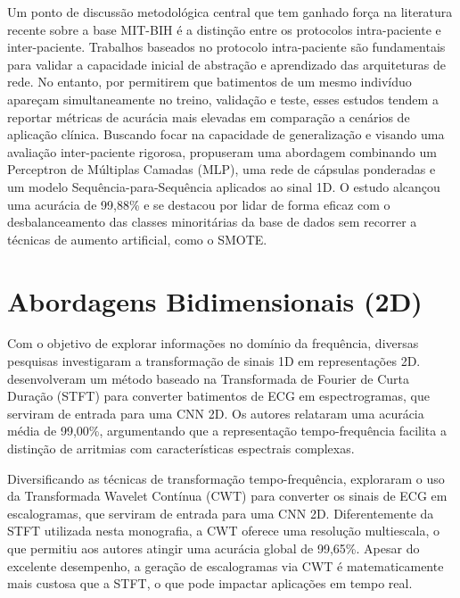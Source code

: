 Um ponto de discussão metodológica central que tem ganhado força na literatura recente sobre a base MIT-BIH é a distinção entre os protocolos 
intra-paciente e inter-paciente. Trabalhos baseados no protocolo intra-paciente são fundamentais para validar a capacidade inicial de abstração e 
aprendizado das arquiteturas de rede. No entanto, por permitirem que batimentos de um mesmo indivíduo apareçam simultaneamente no treino, validação e 
teste, esses estudos tendem a reportar métricas de acurácia mais elevadas em comparação a cenários de aplicação clínica. Buscando focar na capacidade 
de generalização e visando uma avaliação inter-paciente rigorosa,  propuseram uma abordagem combinando um Perceptron de 
Múltiplas Camadas (MLP), uma rede de cápsulas ponderadas e um modelo Sequência-para-Sequência aplicados ao sinal 1D. O estudo alcançou uma acurácia de 
99,88\% e se destacou por lidar de forma eficaz com o desbalanceamento das classes minoritárias da base de dados sem recorrer a técnicas de aumento 
artificial, como o SMOTE.

\section{Abordagens Bidimensionais (2D)}

Com o objetivo de explorar informações no domínio da frequência, diversas pesquisas investigaram a transformação de sinais 1D em representações 2D. 
 desenvolveram um método baseado na Transformada de Fourier de Curta Duração (STFT) para converter batimentos de ECG em espectrogramas, 
que serviram de entrada para uma CNN 2D. Os autores relataram uma acurácia média de 99,00\%, argumentando que a representação tempo-frequência 
facilita a distinção de arritmias com características espectrais complexas.

Diversificando as técnicas de transformação tempo-frequência,  exploraram o uso da Transformada Wavelet Contínua (CWT) para converter os 
sinais de ECG em escalogramas, que serviram de entrada para uma CNN 2D. Diferentemente da STFT utilizada nesta monografia, a CWT oferece uma resolução 
multiescala, o que permitiu aos autores atingir uma acurácia global de 99,65\%. Apesar do excelente desempenho, a geração de escalogramas via CWT 
é matematicamente mais custosa que a STFT, o que pode impactar aplicações em tempo real.

